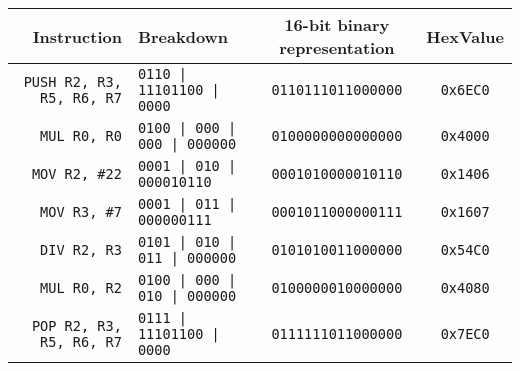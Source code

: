 \begin{tabular}{rlcc}
    \toprule
    \textbf{Instruction}
     &
    \textbf{Breakdown}
     &
    \textbf{16-bit binary representation}
     &
    \textbf{HexValue}
    \\
    \midrule
    \texttt{PUSH R2, R3, R5, R6, R7}
     &
    \texttt{0110 | 11101100 | 0000}
     &
    \texttt{0110111011000000}
     &
    \texttt{0x6EC0}
    \\
    \midrule
    \texttt{MUL R0, R0}
     &
    \texttt{0100 | 000 | 000 | 000000}
     &
    \texttt{0100000000000000}
     &
    \texttt{0x4000}
    \\
    \midrule
    \texttt{MOV R2, \#22}
     &
    \texttt{0001 | 010 | 000010110}
     &
    \texttt{0001010000010110}
     &
    \texttt{0x1406}
    \\
    \midrule
    \texttt{MOV R3, \#7}
     &
    \texttt{0001 | 011 | 000000111}
     &
    \texttt{0001011000000111}
     &
    \texttt{0x1607}
    \\
    \midrule
    \texttt{DIV R2, R3}
     &
    \texttt{0101 | 010 | 011 | 000000}
     &
    \texttt{0101010011000000}
     &
    \texttt{0x54C0}
    \\
    \midrule
    \texttt{MUL R0, R2}
     &
    \texttt{0100 | 000 | 010 | 000000}
     &
    \texttt{0100000010000000}
     &
    \texttt{0x4080}
    \\
    \midrule
    \texttt{POP R2, R3, R5, R6, R7}
     &
    \texttt{0111 | 11101100 | 0000}
     &
    \texttt{0111111011000000}
     &
    \texttt{0x7EC0}
    \\
    \bottomrule
\end{tabular}
